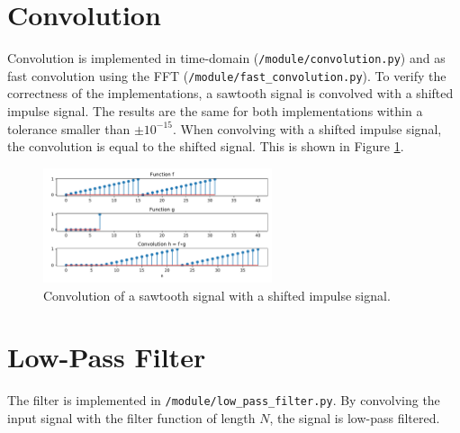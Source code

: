 \documentclass[12pt, a4paper]{report}
\begin{document}
\section{Convolution}
Convolution is implemented in time-domain (\texttt{/module/convolution.py})
and as fast convolution using the \ac{FFT} (\texttt{/module/fast\_convolution.py}).
To verify the correctness of the implementations,
a sawtooth signal is convolved with a shifted impulse signal.
The results are the same for both implementations within a tolerance smaller than \(\pm10^{-15}\).
When convolving with a shifted impulse signal, the convolution is equal to the shifted signal.
This is shown in Figure \ref{fig:convolution}.
\begin{figure}[h!]
	\centering
	\includegraphics[width=0.6\textwidth]{figures/convolution.pdf}
	\caption{Convolution of a sawtooth signal with a shifted impulse signal.}
	\label{fig:convolution}
\end{figure}

\section{Low-Pass Filter}

The filter is implemented in \texttt{/module/low\_pass\_filter.py}.
By convolving the input signal with the filter function of length \(N\),
the signal is low-pass filtered.
\end{document}
